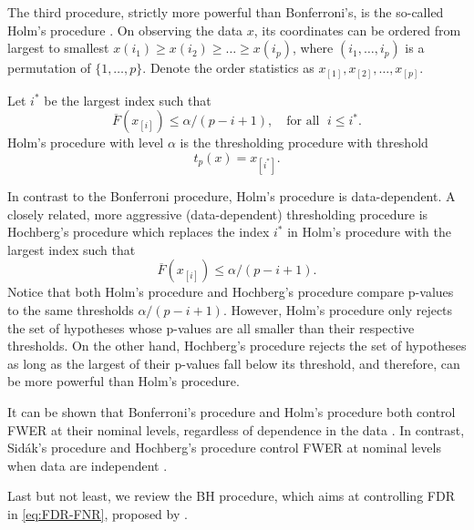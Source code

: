 The third procedure, strictly more powerful than Bonferroni's, is the so-called Holm's procedure \citep{holm1979simple}.
On observing the data $x$, its coordinates can be ordered from largest to smallest
$x(i_1) \ge x(i_2)  \ge \ldots \ge x(i_p)$,
where $(i_1, \ldots, i_p)$ is a permutation of $\{1, \ldots, p\}$. 
Denote the order statistics as $x_{[1]}, x_{[2]}, \ldots, x_{[p]}$.
\begin{definition}
Let $i^*$ be the largest index such that
$$
\overline{F}(x_{[i]}) \le \alpha / (p-i+1),\quad \text{for all }\;i\le i^*.
$$
Holm's procedure with level $\alpha$ is the thresholding procedure with threshold
\begin{equation} \label{eq:Holm-procedure}
    t_p(x) = x_{[i^*]}.
\end{equation}
\end{definition}
In contrast to the Bonferroni procedure, Holm's procedure is data-dependent.
A closely related, more aggressive (data-dependent) thresholding procedure is Hochberg's procedure \citep{hochberg1988sharper}
which replaces the index $i^*$ in Holm's procedure with the largest index such that
$$
\overline{F}(x_{[i]}) \le \alpha / (p-i+1).
$$
Notice that both Holm's procedure and Hochberg's procedure compare p-values to the same thresholds $\alpha / (p-i+1)$.
However, Holm's procedure only rejects the set of hypotheses whose p-values are all smaller than their respective thresholds.
On the other hand, Hochberg's procedure rejects the set of hypotheses as long as the largest of their p-values fall below its threshold, and therefore, can be more powerful than Holm's procedure. 

It can be shown that Bonferroni's procedure and Holm's procedure both control FWER at their nominal levels, regardless of dependence in the data \citep{holm1979simple}.
In contrast, Sid\'ak's procedure and Hochberg's procedure control FWER at nominal levels when data are independent \citep{vsidak1967rectangular, hochberg1988sharper}.

Last but not least, we review the \ac{BH} procedure, which aims at controlling \ac{FDR} in \eqref{eq:FDR-FNR}, proposed by  \cite{benjamini1995controlling}.

